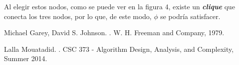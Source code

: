 \documentclass{article}
\begin{document}
Al elegir estos nodos, como se puede ver en la figura 4, existe un \textit{\textbf{clique}} que conecta los tres nodos, por lo que, de este modo,  $\phi$ se podría satisfacer.

\footnotesize{
    \begin{thebibliography}{99}
            Michael Garey, David S. Johnson.
        .
        \newblock W. H. Freeman and Company, 1979.
        
            Lalla Mouatadid.
        .
        \newblock CSC 373 - Algorithm Design, Analysis, and Complexity, Summer 2014.
    \end{thebibliography}
}
\end{document}
